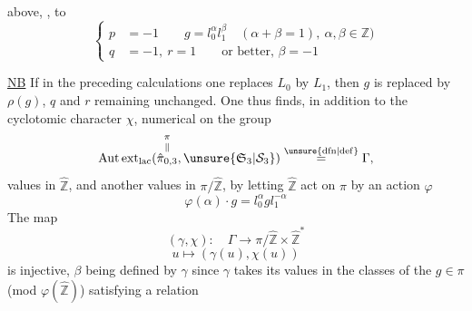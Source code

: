 above,  ,   to
\[
\left\{\begin{aligned}
p&=-1\qquad g=l_0^\alpha l_1^\beta\quad(\alpha+\beta=1),\ \alpha,\beta\in\mathbb Z)\\
q&=-1,\ r=1\qquad\text{or better, }\beta=-1
\end{aligned}\right.
\]

\uline{NB} If in the preceding calculations one replaces $L_0$ by $L_1$, then $g$ is replaced by $\rho(g)$, $q$ and $r$ remaining unchanged. One thus finds, in addition to the cyclotomic character $\chi$,   numerical  \inserted{\uline{$\beta$},} on the group
\[
\operatorname{Aut\,ext}_{\mathrm{lac}}(\overset{\pi}{\overset{\Vert}{\hat\pi_{0,3}}},\unsure{\mathfrak S_3|\mathcal S_3})\overset{\unsure{\mathrm{dfn}|\mathrm{def}}}=\Gamma,
\]
  values in $\hat{\mathbb Z}$, and another \inserted{$\gamma$}  values in $\pi/\hat{\mathbb Z}$, by letting $\hat{\mathbb Z}$ act on $\pi$ by an action $\varphi$
\[
\varphi(\alpha)\cdot g=l_0^\alpha gl_1^{-\alpha}
\]
The map
\[
(\gamma,\chi):\quad\Gamma\longrightarrow\pi/\hat{\mathbb Z}\times\hat{\mathbb Z}^{*}
\]
\[
u\longmapsto(\gamma(u),\chi(u))
\]
\margin{\uline{NB} \inserted{$\gamma_0:\mathcal E_0\longrightarrow\pi$} is a $1$. cocycle on $\mathcal E_0\unsure{=|\simeq}\operatorname{Aut}_{\mathrm{lac}}(\pi,L_0)$, [\deleted{\unsure{group|fixing}} \inserted{which defines} the subgroup of elements which commute externally with $\unsure{\mathfrak S_3|\mathcal S_3}$}
is injective,  $\beta$ being defined by $\gamma$ since $\gamma$ takes its values in the classes of the $g\in\pi$ (mod $\varphi(\hat{\mathbb Z})$) satisfying a relation
